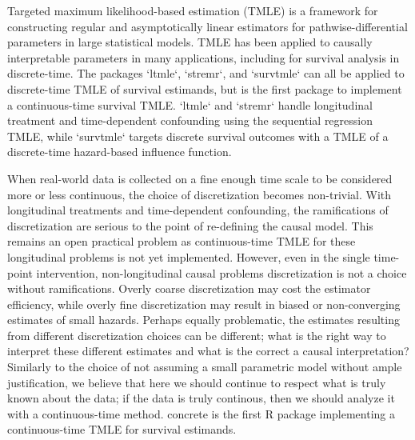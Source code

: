 \documentclass{report}
\newcommand{\1}{\ensuremath{\mathbf{1}}}
\begin{document}
Targeted maximum likelihood-based estimation (TMLE) is a framework for constructing regular and asymptotically linear estimators for pathwise-differential parameters in large statistical models. TMLE has been applied to causally interpretable parameters in many applications, including for survival analysis in discrete-time. The packages `ltmle`, `stremr`, and `survtmle` can all be applied to discrete-time TMLE of survival estimands, but  is the first package to implement a continuous-time survival TMLE. `ltmle` and `stremr` handle longitudinal treatment and time-dependent confounding using the sequential regression TMLE, while `survtmle` targets discrete survival outcomes with a TMLE of a discrete-time hazard-based influence function.

When real-world data is collected on a fine enough time scale to be considered more or less continuous, the choice of discretization becomes non-trivial. With longitudinal treatments and time-dependent confounding, the ramifications of discretization are serious to the point of re-defining the causal model. This remains an open practical problem as continuous-time TMLE for these longitudinal problems is not yet implemented. However, even in the single time-point intervention, non-longitudinal causal problems discretization is not a choice without ramifications. Overly coarse discretization may cost the estimator efficiency, while overly fine discretization may result in biased or non-converging estimates of small hazards. Perhaps equally problematic, the estimates resulting from different discretization choices can be different; what is the right way to interpret these different estimates and what is the correct a causal interpretation? Similarly to the choice of not assuming a small parametric model without ample justification, we believe that here we should continue to respect what is truly known about the data; if the data is truly continous, then we should analyze it with a continuous-time method. concrete is the first R package implementing a continuous-time TMLE for survival estimands.


\newpage

\end{document}

